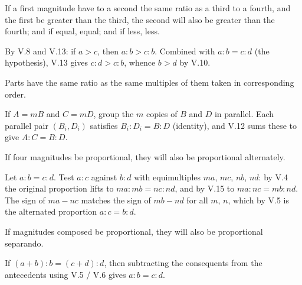 \documentclass{rrxiv}
\begin{document}
\begin{claim}
\label{prop:V.14}
If a first magnitude have to a second the same ratio as a third to a
fourth, and the first be greater than the third, the second will also
be greater than the fourth; and if equal, equal; and if less, less.
\end{claim}
\begin{evidence}[Proof of V.14]
\label{ev:V.14}
By V.8 and V.13: if $a > c$, then $a:b > c:b$.  Combined with $a:b =
c:d$ (the hypothesis), V.13 gives $c:d > c:b$, whence $b > d$ by V.10.
\end{evidence}

\begin{claim}
\label{prop:V.15}
Parts have the same ratio as the same multiples of them taken in
corresponding order.
\end{claim}
\begin{evidence}[Proof of V.15]
\label{ev:V.15}
If $A = mB$ and $C = mD$, group the $m$ copies of $B$ and $D$ in
parallel.  Each parallel pair $(B_i, D_i)$ satisfies $B_i : D_i = B :
D$ (identity), and V.12 sums these to give $A : C = B : D$.
\end{evidence}

\begin{claim}
\label{prop:V.16}
If four magnitudes be proportional, they will also be proportional
alternately.
\end{claim}
\begin{evidence}[Proof of V.16]
\label{ev:V.16}
Let $a : b = c : d$.  Test $a : c$ against $b : d$ with equimultiples
$ma$, $mc$, $nb$, $nd$: by V.4 the original proportion lifts to $ma :
mb = nc : nd$, and by V.15 to $ma : nc = mb : nd$.  The sign of $ma -
nc$ matches the sign of $mb - nd$ for all $m$, $n$, which by V.5 is
the alternated proportion $a : c = b : d$.
\end{evidence}

\begin{claim}
\label{prop:V.17}
If magnitudes composed be proportional, they will also be proportional
separando.
\end{claim}
\begin{evidence}[Proof of V.17]
\label{ev:V.17}
If $(a + b) : b = (c + d) : d$, then subtracting the consequents from
the antecedents using V.5 / V.6 gives $a : b = c : d$.
\end{evidence}
\end{document}
